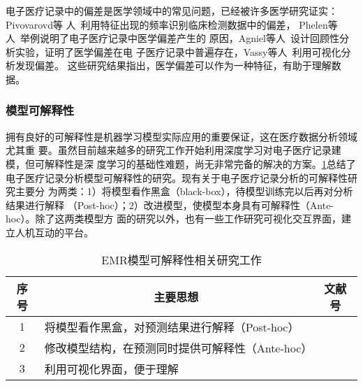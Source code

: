 电子医疗记录中的偏差是医学领域中的常见问题，已经被许多医学研究证实：Pivovarovd等
人~利用特征出现的频率识别临床检测数据中的偏差，
Phelen等人~举例说明了电子医疗记录中医学偏差产生的
原因，Agniel等人~设计回顾性分析实验，证明了医学偏差在电
子医疗记录中普遍存在，Vassy等人~利用可视化分析发现偏差。
这些研究结果指出，医学偏差可以作为一种特征，有助于理解数据。

{}

\subsubsection{模型可解释性}

拥有良好的可解释性是机器学习模型实际应用的重要保证，这在医疗数据分析领域尤其重
要。虽然目前越来越多的研究工作开始利用深度学习对电子医疗记录建模，但可解释性是深
度学习的基础性难题，尚无非常完备的解决的方案。\cref{tab:interpretability}总结了
电子医疗记录分析模型可解释性的研究。现有关于电子医疗记录分析的可解释性研究主要分
为两类：1）将模型看作黑盒（black-box），待模型训练完以后再对分析结果进行解释
（Post-hoc）；2）改进模型，使模型本身具有可解释性（Ante-hoc）。除了这两类模型方
面的研究以外，也有一些工作研究可视化交互界面，建立人机互动的平台。

\begin{table}
    \renewcommand\arraystretch{1.5}
    \begin{small}
        \caption{EMR模型可解释性相关研究工作}
        \label{tab:interpretability}
        \begin{center}
            \begin{tabular}[c]{cll}
                \toprule
                \multicolumn{1}{c}{\textbf{序号}} &
                \multicolumn{1}{c}{\textbf{主要思想}} &
                \multicolumn{1}{c}{\textbf{文献号}}\\
                \midrule
                1 & 将模型看作黑盒，对预测结果进行解释（Post-hoc） & \cite{panigutti2019explaining}
                \cite{panigutti2020doctor} \\
                2 & 修改模型结构，在预测同时提供可解释性（Ante-hoc） &
                \cite{choi2016retain} \cite{ma2017dipole} \cite{bai2018interpretable}
                \cite{gao2019camp} \cite{ma2019adacare} \\
                3 & 利用可视化界面，便于理解 & \cite{kwon2018retainvis} \cite{jin2020carepre}
                \cite{guo2020comparative} \\
                \bottomrule
            \end{tabular}
        \end{center}
    \end{small}
\end{table}

